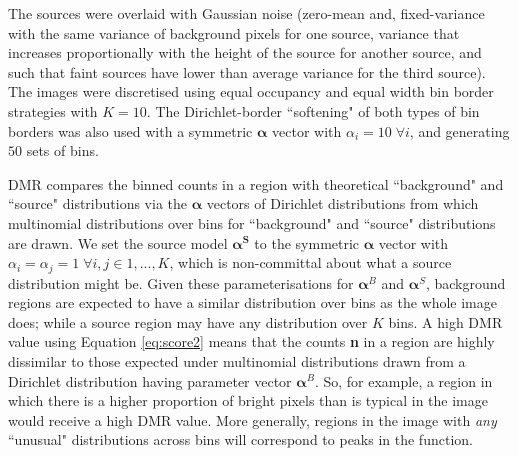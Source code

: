 \documentclass[
    ,final            %
  ]
  {aipproc}
\begin{document}
The sources were overlaid with Gaussian noise (zero-mean and, fixed-variance with the same variance of background pixels for one source, variance that increases proportionally with the height of the source for another source, and such that faint sources have lower than average variance for the third source). 
The images were discretised using equal occupancy and equal width bin border strategies with $K=10$. The Dirichlet-border ``softening" of both types of bin borders was also used with a symmetric $\boldsymbol{\alpha}$ vector with $\alpha_i = 10 \; \forall i$, and generating $50$ sets of bins.

DMR compares the binned counts in a region with theoretical ``background" and ``source" distributions via the $\boldsymbol{\alpha}$ vectors of Dirichlet distributions from which multinomial distributions over bins for ``background" and ``source" distributions are drawn.
We set the source model $\boldsymbol{\alpha^S}$ to the symmetric
$\boldsymbol{\alpha}$ vector with $\alpha_i = \alpha_j = 1 \; \forall
i,j \in 1,...,K$, which is non-committal about what a source
distribution might be. %
Given these parameterisations for $\boldsymbol{\alpha}^B$ and $\boldsymbol{\alpha}^S$, background regions are expected to have a similar distribution over bins as the whole image does; while a source region may have any distribution over $K$ bins. A high DMR value using Equation \ref{eq:score2} means that the counts \textbf{n} in a region are highly dissimilar to those expected under multinomial distributions drawn from a Dirichlet distribution having parameter vector $\boldsymbol{\alpha}^B$. So, for example, a region in which there is a higher proportion of bright pixels than is typical in the image would receive a high DMR value. More generally, regions in the image with \textit{any} ``unusual" distributions across bins will correspond to peaks in the function.
\end{document}
